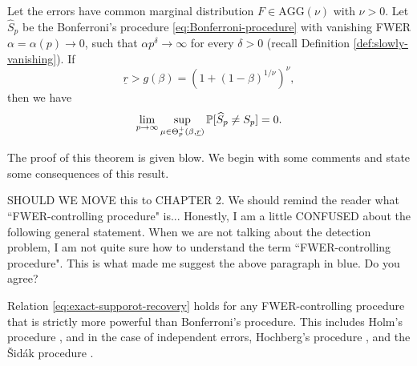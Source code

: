 \begin{theorem} \label{thm:sufficient}
Let the errors have common marginal distribution $F\in \text{AGG}(\nu)$ with $\nu>0$.
Let $\widehat{S}_p$ be the Bonferroni's procedure \eqref{eq:Bonferroni-procedure} with vanishing FWER $\alpha = \alpha(p) \to 0$, such that %
$\alpha p^\delta\to \infty$ for every $\delta>0$ (recall Definition \ref{def:slowly-vanishing}).
If
\begin{equation} \label{eq:signal-above-boundary}
    \underline{r} > g(\beta) = (1 + (1 - \beta)^{1/\nu})^\nu,
\end{equation}
then we have
\begin{equation} \label{eq:exact-supporot-recovery}
    \lim_{p\to\infty}\sup_{\mu\in\Theta_p^+(\beta, \underline{r})} \P[\widehat{S}_p \neq S_p] = 0.
\end{equation}
\end{theorem}

The proof of this theorem is given blow.  We begin with some comments and state some consequences of this result.

{ SHOULD WE MOVE this to CHAPTER 2. We should remind the reader what ``FWER-controlling procedure" is... 
Honestly, I am a little CONFUSED about the following general statement.  When we are not talking about the detection problem, I am not 
quite sure how to understand the term ``FWER-controlling procedure".  This is what made me suggest the above paragraph in blue.  Do you agree?
}

\begin{corollary}
\label{cor:FWER-controlling_procedures}  
Relation \eqref{eq:exact-supporot-recovery} holds for any FWER-controlling procedure that is strictly more powerful than Bonferroni's procedure. 
This includes Holm's procedure \citep*{holm1979simple}, and in the case of independent errors, Hochberg's procedure \citep*{hochberg1988sharper}, and the {\v{S}}id{\'a}k procedure \citep*{vsidak1967rectangular}.
\end{corollary}

